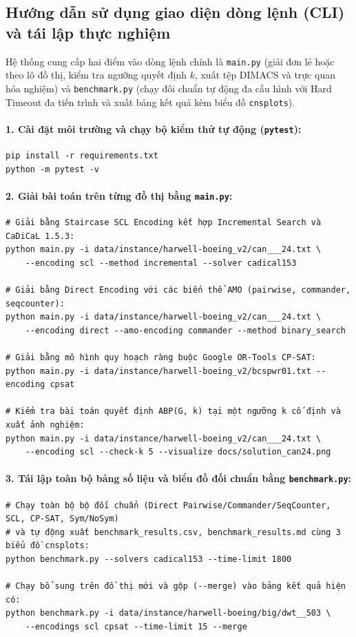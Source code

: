 \documentclass[a4paper,fleqn]{cas-sc}
\begin{document}
\subsection{Hướng dẫn sử dụng giao diện dòng lệnh (CLI) và tái lập thực nghiệm}
Hệ thống cung cấp hai điểm vào dòng lệnh chính là \texttt{main.py} (giải đơn lẻ hoặc theo lô đồ thị, kiểm tra ngưỡng quyết định $k$, xuất tệp DIMACS và trực quan hóa nghiệm) và \texttt{benchmark.py} (chạy đối chuẩn tự động đa cấu hình với Hard Timeout đa tiến trình và xuất bảng kết quả kèm biểu đồ \texttt{cnsplots}).

\paragraph{1. Cài đặt môi trường và chạy bộ kiểm thử tự động (\texttt{pytest}):}
\begin{verbatim}
pip install -r requirements.txt
python -m pytest -v
\end{verbatim}

\paragraph{2. Giải bài toán trên từng đồ thị bằng \texttt{main.py}:}
\begin{verbatim}
# Giải bằng Staircase SCL Encoding kết hợp Incremental Search và CaDiCaL 1.5.3:
python main.py -i data/instance/harwell-boeing_v2/can___24.txt \
    --encoding scl --method incremental --solver cadical153

# Giải bằng Direct Encoding với các biến thể AMO (pairwise, commander, seqcounter):
python main.py -i data/instance/harwell-boeing_v2/can___24.txt \
    --encoding direct --amo-encoding commander --method binary_search

# Giải bằng mô hình quy hoạch ràng buộc Google OR-Tools CP-SAT:
python main.py -i data/instance/harwell-boeing_v2/bcspwr01.txt --encoding cpsat

# Kiểm tra bài toán quyết định ABP(G, k) tại một ngưỡng k cố định và xuất ảnh nghiệm:
python main.py -i data/instance/harwell-boeing_v2/can___24.txt \
    --encoding scl --check-k 5 --visualize docs/solution_can24.png
\end{verbatim}

\paragraph{3. Tái lập toàn bộ bảng số liệu và biểu đồ đối chuẩn bằng \texttt{benchmark.py}:}
\begin{verbatim}
# Chạy toàn bộ bộ đối chuẩn (Direct Pairwise/Commander/SeqCounter, SCL, CP-SAT, Sym/NoSym)
# và tự động xuất benchmark_results.csv, benchmark_results.md cùng 3 biểu đồ cnsplots:
python benchmark.py --solvers cadical153 --time-limit 1800

# Chạy bổ sung trên đồ thị mới và gộp (--merge) vào bảng kết quả hiện có:
python benchmark.py -i data/instance/harwell-boeing/big/dwt__503 \
    --encodings scl cpsat --time-limit 15 --merge
\end{verbatim}
\end{document}
